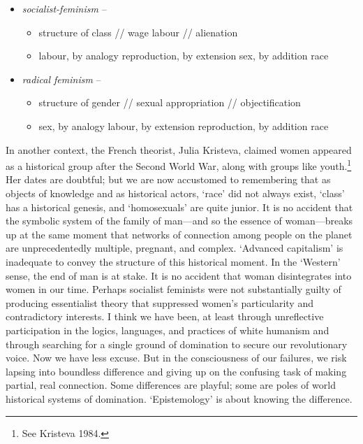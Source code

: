 \documentclass[DIV=12,%
               BCOR=10mm,%
               headinclude=false,%
               footinclude=false,open=any,%
               fontsize=11pt,%
               twoside,%
               paper=210mm:11in]%
               {scrbook}
\newcommand*{\Slash}{\slash\hspace{0pt}}
\begin{document}
\begin{itemize}
\item\relax 
\emph{socialist-feminism} –


\begin{itemize}
\item\relax 
structure of class \Slash{}\Slash{} wage labour \Slash{}\Slash{} alienation



\item\relax 
labour, by analogy reproduction, by extension sex, by addition race




\end{itemize}


\item\relax 
\emph{radical feminism} –


\begin{itemize}
\item\relax 
structure of gender \Slash{}\Slash{} sexual appropriation \Slash{}\Slash{} objectification



\item\relax 
sex, by analogy labour, by extension reproduction, by addition race




\end{itemize}



\end{itemize}

In another context, the French theorist, Julia Kristeva, claimed women appeared as a historical group after the Second World War, along with groups like youth.\footnote{See Kristeva 1984.} Her dates are doubtful; but we are now accustomed to remembering that as objects of knowledge and as historical actors, ‘race’ did not always exist, ‘class’ has a historical genesis, and ‘homosexuals’ are quite junior. It is no accident that the symbolic system of the family of man—and so the essence of woman—breaks up at the same moment that networks of connection among people on the planet are unprecedentedly multiple, pregnant, and complex. ‘Advanced capitalism’ is inadequate to convey the structure of this historical moment. In the ‘Western’ sense, the end of man is at stake. It is no accident that woman disintegrates into women in our time. Perhaps socialist feminists were not substantially guilty of producing essentialist theory that suppressed women’s particularity and contradictory interests. I think we have been, at least through unreflective participation in the logics, languages, and practices of white humanism and through searching for a single ground of domination to secure our revolutionary voice. Now we have less excuse. But in the consciousness of our failures, we risk lapsing into boundless difference and giving up on the confusing task of making partial, real connection. Some differences are playful; some are poles of world historical systems of domination. ‘Epistemology’ is about knowing the difference.
\end{document}
